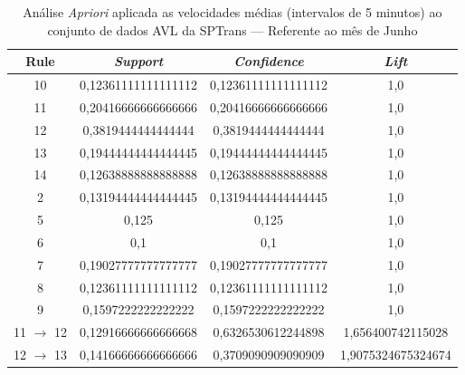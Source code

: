 \documentclass[
	12pt,				%
	oneside,			%
	a4paper,			%
	english,			%
	brazil				%
	]{abntex2ppgsi}
\begin{document}
\begin{apendicesenv}
\begin{table}[!htb]
\centering
\caption {Análise \textit{Apriori} aplicada as velocidades médias (intervalos de 5 minutos) ao conjunto de dados AVL da SPTrans --- Referente ao mês de Junho}
\label {tab:aprioriJune}
\begin{tabular}{c|c|c|c}
\hline
\textbf{Rule} & \textit{\textbf{Support}} & \textit{\textbf{Confidence}} & \textit{\textbf{Lift}} \\
\hline
10 &  0,12361111111111112 &  0,12361111111111112 &  1,0\\
\hline
11 &  0,20416666666666666 &  0,20416666666666666 &  1,0\\
\hline
12 &  0,3819444444444444 &  0,3819444444444444 &  1,0\\
\hline
13 &  0,19444444444444445 &  0,19444444444444445 &  1,0\\
\hline
14 &  0,12638888888888888 &  0,12638888888888888 &  1,0\\
\hline
2 &  0,13194444444444445 &  0,13194444444444445 &  1,0\\
\hline
5 &  0,125 &  0,125 &  1,0\\
\hline
6 &  0,1 &  0,1 &  1,0\\
\hline
7 &  0,19027777777777777 &  0,19027777777777777 &  1,0\\
\hline
8 &  0,12361111111111112 &  0,12361111111111112 &  1,0\\
\hline
9 &  0,1597222222222222 &  0,1597222222222222 &  1,0\\
\hline
11 $\rightarrow$ 12 &  0,12916666666666668 &  0,6326530612244898 &  1,656400742115028\\
\hline
12 $\rightarrow$ 13 &  0,14166666666666666 &  0,3709090909090909 &  1,9075324675324674\\
\hline
\end{tabular}
\end{table}


\end{apendicesenv}
\end{document}
